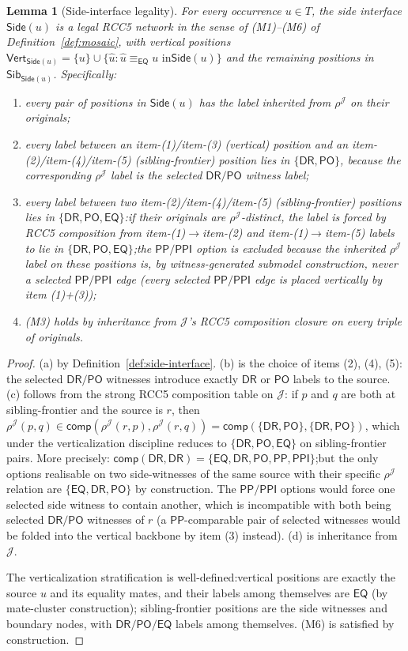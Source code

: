 \documentclass[11pt]{article}
\newtheorem{lemma}[theorem]{Lemma}
\newcommand{\EQ}{\mathsf{EQ}}
\newcommand{\DR}{\mathsf{DR}}
\newcommand{\PO}{\mathsf{PO}}
\newcommand{\PP}{\mathsf{PP}}
\newcommand{\PPI}{\mathsf{PPI}}
\newcommand{\comp}{\mathsf{comp}}
\newcommand{\J}{\mathcal J}
\newcommand{\eqc}{\equiv_{\EQ}}
\newcommand{\Vrt}{\mathsf{Vert}}
\newcommand{\Sib}{\mathsf{Sib}}
\newcommand{\Side}{\mathsf{Side}}
\begin{document}
\begin{lemma}[Side-interface legality]\label{lem:side-placement}
For every occurrence $u\in T$, the side interface $\Side(u)$ is a
legal RCC5 network in the sense of (M1)--(M6) of
Definition~\ref{def:mosaic}, with vertical positions
$\Vrt_{\Side(u)}=\{u\}\cup\{\widehat u : \widehat u\eqc u\text{ in
}\Side(u)\}$ and the remaining positions in $\Sib_{\Side(u)}$.
Specifically:
\begin{enumerate}[label=(\alph*)]
\item every pair of positions in $\Side(u)$ has the label
inherited from $\rho^\J$ on their originals;
\item every label between an item-(1)/item-(3) (vertical) position
and an item-(2)/item-(4)/item-(5) (sibling-frontier) position lies
in $\{\DR,\PO\}$, because the corresponding $\rho^\J$ label is the
selected $\DR/\PO$ witness label;
\item every label between two item-(2)/item-(4)/item-(5)
(sibling-frontier) positions lies in $\{\DR,\PO,\EQ\}$:\@ if their
originals are $\rho^\J$-distinct, the label is forced by RCC5
composition from item-(1)$\to$item-(2) and item-(1)$\to$item-(5)
labels to lie in $\{\DR,\PO,\EQ\}$;\@ the $\PP/\PPI$ option is
excluded because the inherited $\rho^\J$ label on these positions
is, by witness-generated submodel construction, never a selected
$\PP/\PPI$ edge (every selected $\PP/\PPI$ edge is placed
vertically by item (1)+(3));
\item (M3) holds by inheritance from $\J$'s RCC5 composition
closure on every triple of originals.
\end{enumerate}
\end{lemma}

\begin{proof}
(a) by Definition~\ref{def:side-interface}.  (b) is the choice of
items (2), (4), (5): the selected $\DR/\PO$ witnesses introduce
exactly $\DR$ or $\PO$ labels to the source.  (c) follows from the
strong RCC5 composition table on $\J$: if $p$ and $q$ are both at
sibling-frontier and the source is $r$, then $\rho^\J(p,q)\in
\comp(\rho^\J(r,p),\rho^\J(r,q))=\comp(\{\DR,\PO\},\{\DR,\PO\})$,
which under the verticalization discipline reduces to
$\{\DR,\PO,\EQ\}$ on sibling-frontier pairs.  More precisely:
$\comp(\DR,\DR)=\{\EQ,\DR,\PO,\PP,\PPI\}$;\@ but the only options
realisable on two side-witnesses of the same source with their
specific $\rho^\J$ relation are $\{\EQ,\DR,\PO\}$ by construction.
The $\PP/\PPI$ options would force one selected side witness to
contain another, which is incompatible with both being selected
$\DR/\PO$ witnesses of $r$ (a $\PP$-comparable pair of selected
witnesses would be folded into the vertical backbone by item (3)
instead).  (d) is inheritance from $\J$.

The verticalization stratification is well-defined:\@ vertical
positions are exactly the source $u$ and its equality mates, and
their labels among themselves are $\EQ$ (by mate-cluster
construction); sibling-frontier positions are the side witnesses
and boundary nodes, with $\DR/\PO/\EQ$ labels among themselves.
(M6) is satisfied by construction.
\end{proof}
\end{document}
